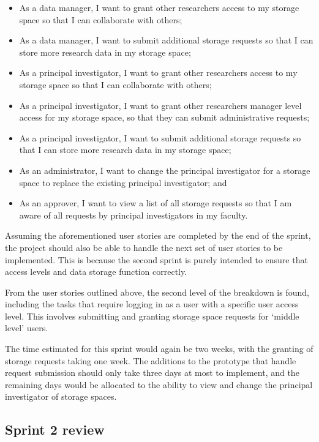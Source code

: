 \documentclass[a4paper,titlepage,12pt]{article}
\begin{document}
\begin{itemize}
	\item As a data manager, I want to grant other researchers access to my
	      storage space so that I can collaborate with others;
	\item As a data manager, I want to submit additional storage requests
	      so that I can store more research data in my storage space;
	\item As a principal investigator, I want to grant other researchers
	      access to my storage space so that I can collaborate with others;
	\item As a principal investigator, I want to grant other researchers
	      manager level access for my storage space, so that they can
	      submit administrative requests;
	\item As a principal investigator, I want to submit additional storage
	      requests so that I can store more research data in my storage
	      space;
	\item As an administrator, I want to change the principal investigator
	      for a storage space to replace the existing principal
	      investigator; and
	\item As an approver, I want to view a list of all storage requests so
	      that I am aware of all requests by principal investigators in my
	      faculty.
\end{itemize}

Assuming the aforementioned user stories are completed by the end of the
sprint, the project should also be able to handle the next set of user stories
to be implemented. This is because the second sprint is purely intended to
ensure that access levels and data storage function correctly.

From the user stories outlined above, the second level of the breakdown is
found, including the tasks that require logging in as a user with a specific
user access level. This involves submitting and granting storage space requests
for `middle level' users.

The time estimated for this sprint would again be two weeks, with the granting
of storage requests taking one week. The additions to the prototype that handle
request submission should only take three days at most to implement, and the
remaining days would be allocated to the ability to view and change the
principal investigator of storage spaces.

\subsection{Sprint 2 review}
\end{document}
